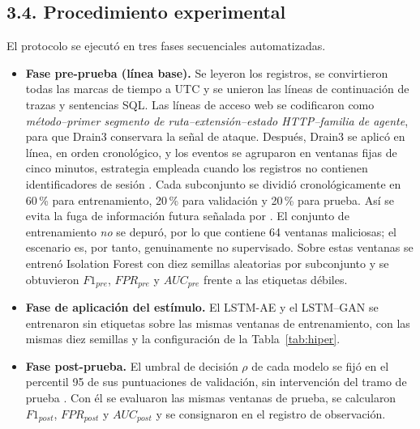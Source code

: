 \documentclass[jou,a4paper,floatsintext,donotrepeattitle]{apa7}
\begin{document}
\subsection{3.4. Procedimiento experimental}
El protocolo se ejecutó en tres fases secuenciales automatizadas.

\begin{itemize}
  \item \textbf{Fase pre-prueba (línea base).} Se leyeron los registros, se convirtieron todas las marcas de tiempo a UTC y se unieron las líneas de continuación de trazas y sentencias SQL. Las líneas de acceso web se codificaron como \textit{método–primer segmento de ruta–extensión–estado HTTP–familia de agente}, para que Drain3 conservara la señal de ataque. Después, Drain3 se aplicó en línea, en orden cronológico, y los eventos se agruparon en ventanas fijas de cinco minutos, estrategia empleada cuando los registros no contienen identificadores de sesión \parencite{almodovar2024}. Cada subconjunto se dividió cronológicamente en 60\,\% para entrenamiento, 20\,\% para validación y 20\,\% para prueba. Así se evita la fuga de información futura señalada por \textcite{albert2025}. El conjunto de entrenamiento \emph{no} se depuró, por lo que contiene 64 ventanas maliciosas; el escenario es, por tanto, genuinamente no supervisado. Sobre estas ventanas se entrenó Isolation Forest con diez semillas aleatorias por subconjunto y se obtuvieron $F1_{pre}$, $FPR_{pre}$ y $AUC_{pre}$ frente a las etiquetas débiles.
  \item \textbf{Fase de aplicación del estímulo.} El LSTM-AE y el LSTM--GAN se entrenaron sin etiquetas sobre las mismas ventanas de entrenamiento, con las mismas diez semillas y la configuración de la Tabla~\ref{tab:hiper}.
  \item \textbf{Fase post-prueba.} El umbral de decisión $\rho$ de cada modelo se fijó en el percentil 95 de sus puntuaciones de validación, sin intervención del tramo de prueba \parencite{albert2025,qian2025}. Con él se evaluaron las mismas ventanas de prueba, se calcularon $F1_{post}$, $FPR_{post}$ y $AUC_{post}$ y se consignaron en el registro de observación.
\end{itemize}
\end{document}
